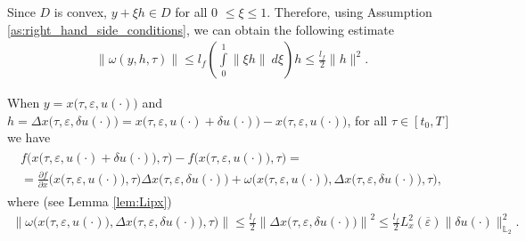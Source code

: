 \documentclass[../main.tex]{subfiles}
\begin{document}
Since $D$ is convex, $ y + \xi h \in D$ for all 0 $\leqslant \xi \leqslant 1$.
Therefore, using Assumption \ref{as:right_hand_side_conditions}, we can obtain the following estimate
\begin{gather*}
	\|\omega(y,h,\tau)\| \leqslant l_f \left( \int\limits_0^1  \left\| \xi h \right\| \ d\xi \right)h  \leqslant \frac{l_f}{2} \|h\|^2.
\end{gather*}

When $y = x\big(\tau,\varepsilon, u(\cdot)\big)$  and $h = \Delta x\big(\tau, \varepsilon, \delta u(\cdot)\big) = x\big(\tau,\varepsilon, u(\cdot) + \delta u(\cdot)\big) - x\big(\tau,\varepsilon, u(\cdot)\big)$, for all $\tau \in [t_0,T]$ we have
\begin{gather}\label{mean-value}
	\begin{gathered}
		f\Big(x\big(\tau,\varepsilon, u(\cdot) + \delta u(\cdot)\big),\tau\Big) -
		f\Big(x\big(\tau,\varepsilon, u(\cdot)\big),\tau\Big) = \\ = 
		\frac{\partial f}{\partial x}  \Big(x\big(\tau,\varepsilon, u(\cdot)\big), \tau\Big) 
		\Delta x\big(\tau, \varepsilon, \delta u(\cdot)\big)  + 
		\omega\Big(x\big(\tau,\varepsilon, u(\cdot)\big),\Delta x\big(\tau, \varepsilon, \delta u(\cdot)\big),\tau\Big),
	\end{gathered}
\end{gather}
where (see Lemma \ref{lem:Lipx})
\begin{gather}\label{omega_est}
	\left\|\omega\Big(x\big(\tau,\varepsilon, u(\cdot)\big),\Delta x\big(\tau, \varepsilon, \delta u(\cdot)\big),\tau\Big)\right\| 
	\leqslant
	\frac{l_f}{2} \left\|\Delta x\big(\tau, \varepsilon, \delta u(\cdot)\big)\right\|^2 
	\leqslant
	\frac{l_f}{2} L_x^2(\overline{\varepsilon}) \|\delta u(\cdot)\|_{\mathbb{L}_2}^2.
\end{gather}
\end{document}
